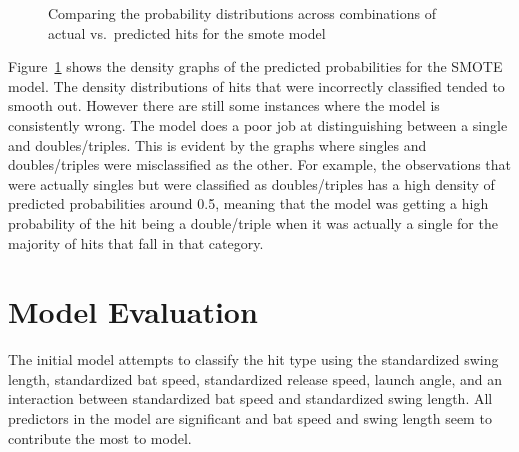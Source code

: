 \documentclass[
  letterpaper,
  DIV=11,
  numbers=noendperiod]{scrartcl}
\begin{document}
\begin{figure}[H]


\caption{\label{fig-pred-den-smote}Comparing the probability
distributions across combinations of actual vs.~predicted hits for the
smote model}

\end{figure}%

Figure~\ref{fig-pred-den-smote} shows the density graphs of the
predicted probabilities for the SMOTE model. The density distributions
of hits that were incorrectly classified tended to smooth out. However
there are still some instances where the model is consistently wrong.
The model does a poor job at distinguishing between a single and
doubles/triples. This is evident by the graphs where singles and
doubles/triples were misclassified as the other. For example, the
observations that were actually singles but were classified as
doubles/triples has a high density of predicted probabilities around
0.5, meaning that the model was getting a high probability of the hit
being a double/triple when it was actually a single for the majority of
hits that fall in that category.

\section{Model Evaluation}\label{model-evaluation}

The initial model attempts to classify the hit type using the
standardized swing length, standardized bat speed, standardized release
speed, launch angle, and an interaction between standardized bat speed
and standardized swing length. All predictors in the model are
significant and bat speed and swing length seem to contribute the most
to model.
\end{document}
